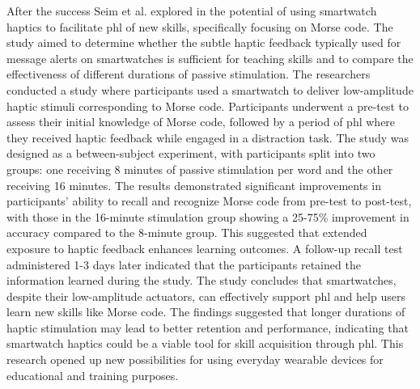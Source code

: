 After the success Seim et al. explored in \cite{Seim2018} the potential of using smartwatch haptics to facilitate \gls{phl} of new skills, specifically focusing on Morse code. The study aimed to determine whether the subtle haptic feedback typically used for message alerts on smartwatches is sufficient for teaching skills and to compare the effectiveness of different durations of passive stimulation.
The researchers conducted a study where participants used a smartwatch to deliver low-amplitude haptic stimuli corresponding to Morse code. Participants underwent a pre-test to assess their initial knowledge of Morse code, followed by a period of \gls{phl} where they received haptic feedback while engaged in a distraction task. The study was designed as a between-subject experiment, with participants split into two groups: one receiving 8 minutes of passive stimulation per word and the other receiving 16 minutes.
The results demonstrated significant improvements in participants' ability to recall and recognize Morse code from pre-test to post-test, with those in the 16-minute stimulation group showing a 25-75\% improvement in accuracy compared to the 8-minute group. This suggested that extended exposure to haptic feedback enhances learning outcomes. A follow-up recall test administered 1-3 days later indicated that the participants retained the information learned during the study.
The study concludes that smartwatches, despite their low-amplitude actuators, can effectively support \gls{phl} and help users learn new skills like Morse code. The findings suggested that longer durations of haptic stimulation may lead to better retention and performance, indicating that smartwatch haptics could be a viable tool for skill acquisition through \gls{phl}. This research opened up new possibilities for using everyday wearable devices for educational and training purposes.


